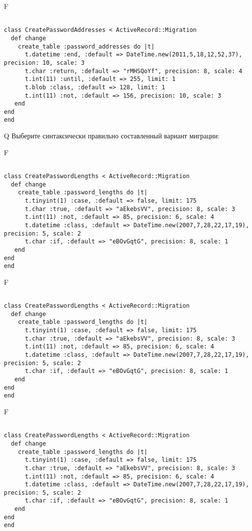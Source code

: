 F
\begin{verbatim}
		
class CreatePasswordAddresses < ActiveRecord::Migration 
  def change 
    create_table :password_addresses do |t| 
      t.datetime :end, :default => DateTime.new(2011,5,18,12,52,37), precision: 10, scale: 3
      t.char :return, :default => "rMHSQoYf", precision: 8, scale: 4
      t.int(11) :until, :default => 255, limit: 1
      t.blob :class, :default => 128, limit: 1
      t.int(11) :not, :default => 156, precision: 10, scale: 3
   end
end
end
\end{verbatim}

Q
Выберите синтаксически правильно составленный вариант миграции:

F
\begin{verbatim}
		
class CreatePasswordLengths < ActiveRecord::Migration 
  def change 
    create_table :password_lengths do |t| 
      t.tinyint(1) :case, :default => false, limit: 175
      t.char :true, :default => "aEkebsVV", precision: 8, scale: 3
      t.int(11) :not, :default => 85, precision: 6, scale: 4
      t.datetime :class, :default => DateTime.new(2007,7,28,22,17,19), precision: 5, scale: 2
      t.char :if, :default => "eBOvGqtG", precision: 8, scale: 1
   end
end
end
\end{verbatim}

F
\begin{verbatim}
		
class CreatePasswordLengths < ActiveRecord::Migration 
  def change 
    create_table :password_lengths do |t| 
      t.tinyint(1) :case, :default => false, limit: 175
      t.char :true, :default => "aEkebsVV", precision: 8, scale: 3
      t.int(11) :not, :default => 85, precision: 6, scale: 4
      t.datetime :class, :default => DateTime.new(2007,7,28,22,17,19), precision: 5, scale: 2
      t.char :if, :default => "eBOvGqtG", precision: 8, scale: 1
   end
end
end
\end{verbatim}

F
\begin{verbatim}
		
class CreatePasswordLengths < ActiveRecord::Migration 
  def change 
    create_table :password_lengths do |t| 
      t.tinyint(1) :case, :default => false, limit: 175
      t.char :true, :default => "aEkebsVV", precision: 8, scale: 3
      t.int(11) :not, :default => 85, precision: 6, scale: 4
      t.datetime :class, :default => DateTime.new(2007,7,28,22,17,19), precision: 5, scale: 2
      t.char :if, :default => "eBOvGqtG", precision: 8, scale: 1
   end
end
end
\end{verbatim}


